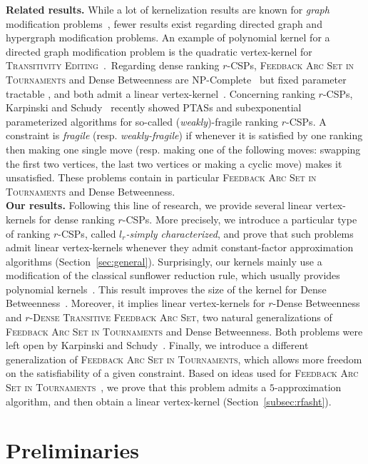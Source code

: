 \documentclass[11pt]{article}
\newcommand{\BIT}{{\sc Dense Betweenness}}
\newcommand{\FAST}{\textsc{Feedback Arc Set in Tournaments}}
\newcommand{\rBIT}{{\sc $r$-Dense Betweenness}}
\newcommand{\rFAST}{\textsc{$r$-Dense Transitive Feedback Arc Set}}
\begin{document}
\noindent \textbf{Related results.} While a lot of kernelization results are known for \emph{graph} modification 
problems~\cite{BP11,KW09,Tho10,vBMN10}, fewer results exist regarding directed graph and hypergraph modification problems. 
An example of polynomial kernel for a directed graph modification problem is the 
quadratic vertex-kernel for \textsc{Transitivity Editing}~\cite{WKNU09}.~Regarding dense ranking $r$-CSPs, \FAST{} and \BIT{} are NP-Complete~\cite{AA07,Alo06,CTY07} but fixed parameter tractable \cite{ALS09,KS10}, and both admit a linear vertex-kernel~\cite{PPT11}. Concerning ranking $r$-CSPs, Karpinski and Schudy~\cite{KS11} recently showed PTASs and subexponential parameterized algorithms for so-called (\emph{weakly})-fragile ranking $r$-CSPs. A constraint is \emph{fragile} (resp. \emph{weakly-fragile}) if whenever it is satisfied by one ranking then 
making one single move (resp. making one of the following moves: swapping the first two vertices, the last two vertices 
or making a cyclic move) makes it unsatisfied. These problems contain in particular \FAST{} and \BIT{}. \\

\noindent \textbf{Our results.} Following this line of research, we provide several linear  vertex-kernels for dense ranking $r$-CSPs. 
More precisely, we introduce a particular type of 
ranking $r$-CSPs, called \emph{$l_r$-simply characterized}, and prove that such problems admit linear vertex-kernels whenever they admit constant-factor approximation algorithms (Section~\ref{sec:general}). Surprisingly, our kernels mainly 
use a modification of the classical sunflower reduction rule, which usually provides polynomial kernels~\cite{ALS09,BP11,GHPP12}. This result improves the size of the kernel for \BIT{}~\cite{PPT11}. Moreover, it implies linear vertex-kernels for \rBIT{} and \rFAST{}, two natural generalizations of \FAST{} and \BIT{}. Both problems were left open by Karpinski and Schudy~\cite{KS11}. 
Finally, we introduce a different generalization of \FAST{}, which allows more freedom on the satisfiability of a given constraint. 
Based on ideas used for \FAST{}~\cite{CFR06}, we prove that this problem admits a $5$-approximation algorithm, and then obtain a linear vertex-kernel (Section~\ref{subsec:rfasht}). 

\section{Preliminaries}
\label{sec:prelim}
\end{document}
